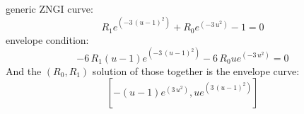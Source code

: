 \documentclass{article}
\begin{document}
generic ZNGI curve:
\[R_{1} e^{\left(-3 \, {\left(u - 1\right)}^{2}\right)} + R_{0} e^{\left(-3 \, u^{2}\right)} - 1 = 0 \
\]
envelope condition:
\[-6 \, R_{1} {\left(u - 1\right)} e^{\left(-3 \, {\left(u - 1\right)}^{2}\right)} - 6 \, R_{0} u e^{\left(-3 \, u^{2}\right)} = 0 \
\]
And the $(R_0,R_1)$ solution of those together is the envelope curve:
\[\left[-{\left(u - 1\right)} e^{\left(3 \, u^{2}\right)}, u e^{\left(3 \, {\left(u - 1\right)}^{2}\right)}\right] \
\]
\end{document}
